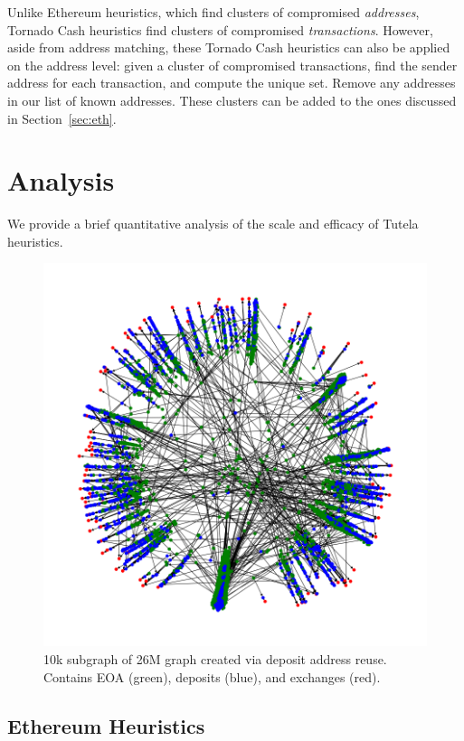 \documentclass[11pt,a4paper]{article}
\begin{document}
Unlike Ethereum heuristics, which find clusters of compromised \textit{addresses}, Tornado Cash heuristics find clusters of compromised \textit{transactions}. However, aside from address matching, these Tornado Cash heuristics can also be applied on the address level: given a cluster of compromised transactions, find the sender address for each transaction, and compute the unique set. Remove any addresses in our list of known addresses. These clusters can be added to the ones discussed in Section~\ref{sec:eth}.

\section{Analysis}

We provide a brief quantitative analysis of the scale and efficacy of Tutela heuristics.
\begin{figure}[h!]
\includegraphics[width=\linewidth]{figures/dar_graph.png}
\caption{10k subgraph of 26M graph created via deposit address reuse. Contains EOA (green), deposits (blue), and exchanges (red).}
\label{fig:dargraph}
\end{figure}
\subsection{Ethereum Heuristics}
\end{document}
